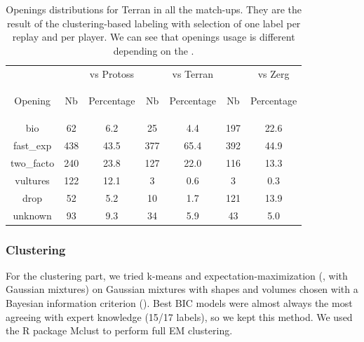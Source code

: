 \begin{table}[h]
\caption{Openings distributions for Terran in all the match-ups. They are the result of the clustering-based labeling with selection of one label per replay and per player. We can see that openings usage is different depending on the .}
\begin{center}
\begin{tabular}{|c|cc|cc|cc|}
\hline
&  & vs Protoss &  & vs Terran &  & vs Zerg \\
Opening
& Nb
& \begin{scriptsize}Percentage\end{scriptsize}
& Nb
& \begin{scriptsize}Percentage\end{scriptsize}
& Nb
& \begin{scriptsize}Percentage\end{scriptsize} \\ \hline
bio 	    & 62 	& 6.2 	& 25 	& 4.4   & 197 	& 22.6 \\
fast\_exp 	& 438 	& 43.5 	& 377 	& 65.4  & 392 	& 44.9 \\
two\_facto 	& 240 	& 23.8  & 127 	& 22.0  & 116 	& 13.3 \\
vultures 	& 122 	& 12.1  & 3 	& 0.6   & 3 	& 0.3  \\
drop 	    & 52 	& 5.2   & 10 	& 1.7   & 121 	& 13.9 \\
unknown 	& 93 	& 9.3   & 34 	& 5.9   & 43 	& 5.0 \\ \hline
\end{tabular}
\label{tab:openings_distrib}
\end{center}
\end{table}


\subsubsection{Clustering}

For the clustering part, we tried k-means and expectation-maximization (, with Gaussian mixtures) on Gaussian mixtures with shapes and volumes chosen with a Bayesian information criterion (). Best BIC models were almost always the most agreeing with expert knowledge (15/17 labels), so we kept this method. We used the R package Mclust \citep{Mclust,Mclust2} to perform full EM clustering. 

